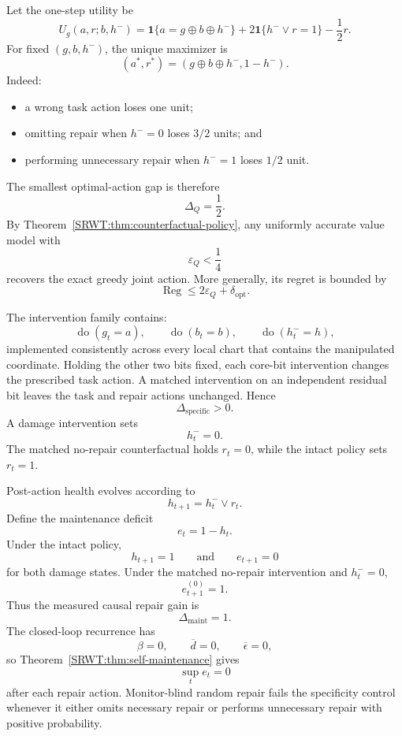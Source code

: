 
Let the one-step utility be
\[
U_g(a,r;b,h^-)
=
\mathbf 1\{a=g\oplus b\oplus h^-\}
+2\mathbf 1\{h^-\lor r=1\}
-\frac12r.
\]
For fixed \((g,b,h^-)\), the unique maximizer is
\[
\boxed{
(a^*,r^*)
=
(g\oplus b\oplus h^-,1-h^-).
}
\]
Indeed:
\begin{itemize}
\item a wrong task action loses one unit;
\item omitting repair when \(h^-=0\) loses \(3/2\) units; and
\item performing unnecessary repair when \(h^-=1\) loses \(1/2\) unit.
\end{itemize}
The smallest optimal-action gap is therefore
\[
\Delta_Q=\frac12.
\]
By Theorem~\ref{SRWT:thm:counterfactual-policy}, any uniformly accurate value model with
\[
\varepsilon_Q<\frac14
\]
recovers the exact greedy joint action. More generally, its regret is bounded
by
\[
\operatorname{Reg}\leq2\varepsilon_Q+\delta_{\mathrm{opt}}.
\]


The intervention family contains:
\[
\operatorname{do}(g_t=a),
\qquad
\operatorname{do}(b_t=b),
\qquad
\operatorname{do}(h_t^-=h),
\]
implemented consistently across every local chart that contains the manipulated
coordinate. Holding the other two bits fixed, each core-bit intervention
changes the prescribed task action. A matched intervention on an independent
residual bit leaves the task and repair actions unchanged. Hence
\[
\Delta_{\mathrm{specific}}>0.
\]
A damage intervention sets
\[
h_t^-=0.
\]
The matched no-repair counterfactual holds \(r_t=0\), while the intact policy
sets \(r_t=1\).


Post-action health evolves according to
\[
h_{t+1}=h_t^-\lor r_t.
\]
Define the maintenance deficit
\[
e_t=1-h_t.
\]
Under the intact policy,
\[
h_{t+1}=1
\qquad\text{and}\qquad
e_{t+1}=0
\]
for both damage states. Under the matched no-repair intervention and
\(h_t^-=0\),
\[
e_{t+1}^{(0)}=1.
\]
Thus the measured causal repair gain is
\[
\boxed{
\Delta_{\mathrm{maint}}=1.
}
\]
The closed-loop recurrence has
\[
\beta=0,
\qquad
\overline d=0,
\qquad
\overline\epsilon=0,
\]
so Theorem~\ref{SRWT:thm:self-maintenance} gives
\[
\sup_t e_t=0
\]
after each repair action. Monitor-blind random repair fails the specificity
control whenever it either omits necessary repair or performs unnecessary
repair with positive probability.

